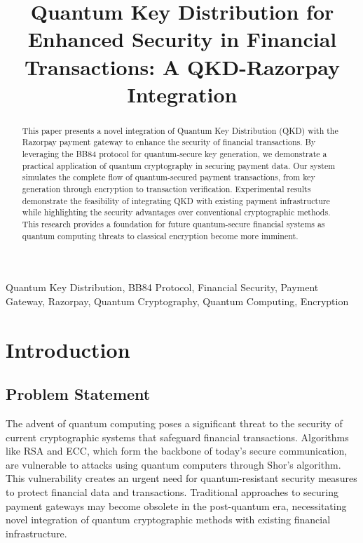 \documentclass[conference]{IEEEtran}
\begin{document}
\title{Quantum Key Distribution for Enhanced Security in Financial Transactions: A QKD-Razorpay Integration}

\author{
}

\maketitle

\begin{abstract}
This paper presents a novel integration of Quantum Key Distribution (QKD) with the Razorpay payment gateway to enhance the security of financial transactions. By leveraging the BB84 protocol for quantum-secure key generation, we demonstrate a practical application of quantum cryptography in securing payment data. Our system simulates the complete flow of quantum-secured payment transactions, from key generation through encryption to transaction verification. Experimental results demonstrate the feasibility of integrating QKD with existing payment infrastructure while highlighting the security advantages over conventional cryptographic methods. This research provides a foundation for future quantum-secure financial systems as quantum computing threats to classical encryption become more imminent.
\end{abstract}

\begin{IEEEkeywords}
Quantum Key Distribution, BB84 Protocol, Financial Security, Payment Gateway, Razorpay, Quantum Cryptography, Quantum Computing, Encryption
\end{IEEEkeywords}

\section{Introduction}

\subsection{Problem Statement}
The advent of quantum computing poses a significant threat to the security of current cryptographic systems that safeguard financial transactions. Algorithms like RSA and ECC, which form the backbone of today's secure communication, are vulnerable to attacks using quantum computers through Shor's algorithm. This vulnerability creates an urgent need for quantum-resistant security measures to protect financial data and transactions. Traditional approaches to securing payment gateways may become obsolete in the post-quantum era, necessitating novel integration of quantum cryptographic methods with existing financial infrastructure.
\end{document}
